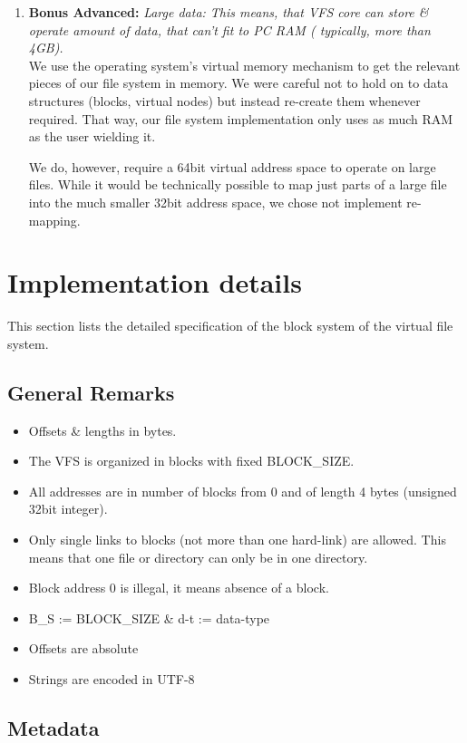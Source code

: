 \documentclass[a4paper,12pt]{article}
\begin{document}
\begin{enumerate}
	\item \textbf{Bonus Advanced:} \emph{Large data: This means, that VFS core can store \& operate amount of data, that can't fit to PC RAM ( typically, more than 4GB).}\\
		We use the operating system's virtual memory mechanism to get the relevant pieces of our file system in memory. 
We were careful not to hold on to data structures (blocks, virtual nodes) but instead re-create them whenever required.
That way, our file system implementation only uses as much RAM as the user wielding it.

We do, however, require a 64bit virtual address space to operate on large files. 
While it would be technically possible to map just parts of a large file into the much smaller 32bit address space, we chose not implement re-mapping.
\end{enumerate}

\section{Implementation details}\label{sct:impl}

This section lists the detailed specification of the block system of the virtual file system.

\subsection{General Remarks}

\begin{itemize}
	\item Offsets \& lengths in bytes.
	\item The VFS is organized in blocks with fixed BLOCK\_SIZE.
	\item All addresses are in number of blocks from 0 and of length 4 bytes (unsigned 32bit integer).
	\item Only single links to blocks (not more than one hard-link) are allowed. This means that one file or directory can only be in one directory.
	\item Block address 0 is illegal, it means absence of a block.
	\item B\_S := BLOCK\_SIZE \& d-t := data-type
	\item Offsets are absolute
	\item Strings are encoded in UTF-8
\end{itemize}

\subsection{Metadata}
\end{document}
